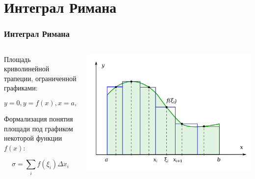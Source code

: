 \documentclass[aspectratio=169]{beamer}
\begin{document}
\section{Интеграл Римана}

\begin{frame}
\frametitle{Интеграл Римана}
\begin{columns}[c]
    \begin{column}{0.45\textwidth}
        Площадь криволинейной трапеции, ограниченной графиками:

        $$
        y = 0, y = f(x), x = a, x = b
        $$

        Формализация понятия площади под графиком некоторой функции $f(x)$:

        $$
        \sigma = \sum_i f(\xi_i) \Delta x_i
        $$
    \end{column}
    \begin{column}{0.45\textwidth}
        \includegraphics[width=\textwidth]{images/riemann_integral.png}
    \end{column}
\end{columns}
\end{frame}
\end{document}
